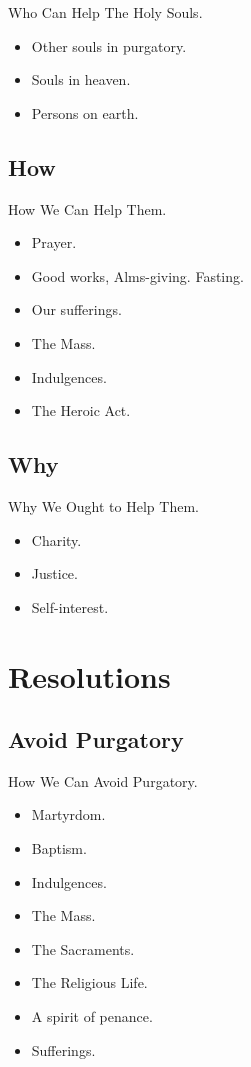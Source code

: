 \documentclass{beamer}
\begin{document}
\begin{frame}{Who Can Help The Holy Souls.}
\begin{itemize}
 \item Other souls in purgatory.
 \item Souls in heaven.
 \item Persons on earth.
\end{itemize}
\end{frame}

\subsection{How}

\begin{frame}{How We Can Help Them.}
\begin{itemize}
 \item Prayer.
 \item Good works, Alms-giving. Fasting.
 \item Our sufferings.
 \item The Mass.
 \item Indulgences.
 \item The Heroic Act.
\end{itemize}
\end{frame}

\subsection{Why}

\begin{frame}{Why We Ought to Help Them.}
\begin{itemize}
 \item Charity.
 \item Justice.
 \item Self-interest.
\end{itemize}
\end{frame}

\section{Resolutions}

\subsection{Avoid Purgatory}

\begin{frame}{How We Can Avoid Purgatory.}
\begin{itemize}
 \item Martyrdom.
 \item Baptism.
 \item Indulgences.
 \item The Mass.
 \item The Sacraments.
 \item The Religious Life.
 \item A spirit of penance.
 \item Sufferings.
\end{itemize}
\end{frame}
\end{document}

